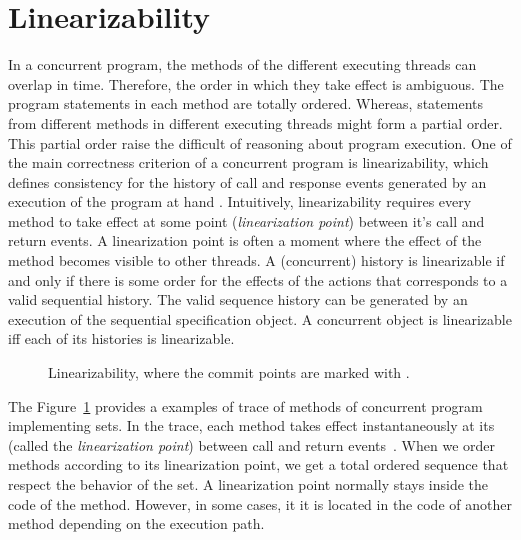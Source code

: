 \section*{Linearizability}      
\label{section:specification:concurrent:data:structure}     
%         
\begingroup%
In a concurrent program, the methods of the different executing threads can overlap in time. Therefore, the order in which they take effect is ambiguous. The program statements 
in each method are totally ordered. Whereas, statements from different methods in different executing threads might form a partial order. This partial order raise the difficult of reasoning about program execution. One of the main correctness criterion of a concurrent program is linearizability, which defines consistency for the history
of call and response events generated by an execution of the program at hand \cite{HeWi:linearizability}. Intuitively, linearizability requires every method to take effect
at some point ({\emph {linearization point}}) between it's call and return events. A linearization point is often a moment where the effect of the method
becomes visible to other threads. A (concurrent) history is linearizable if and only if there is some order for
the effects of the actions that corresponds to a valid sequential history. The valid sequence history can be generated by an execution of the sequential specification object. A concurrent object is linearizable iff each of its histories
is linearizable.

\setlength\intextsep{\dazintextsep}
\begin{figure}[ht]
  \centering
  \caption{Linearizability, where the commit points are marked with \protect\commitpoint{}.}
  \label{figure:shape:linearizability}  
\end{figure}          
  

%
The Figure~\ref{figure:shape:linearizability} provides a examples of trace of methods of concurrent program implementing sets.
In the trace, each method takes effect
instantaneously at its (called the \emph{linearization point})
between call and return events~\cite{HeWi:linearizability}. When we order methods according to its linearization point, we get a total ordered sequence that respect the behavior of the set.
A linearization point normally stays inside the code of the
method.  However, in some cases, it it is located in
the code of another method depending on the execution path.



\endgroup